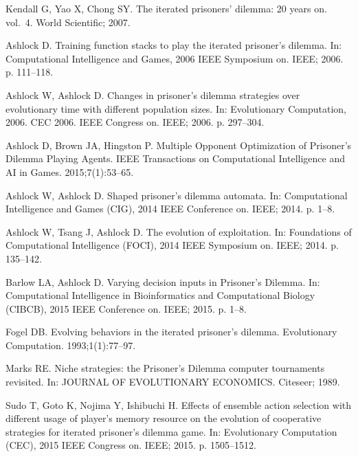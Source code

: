 \documentclass[10pt,letterpaper]{article}
\begin{document}
\begin{thebibliography}{10}
Kendall G, Yao X, Chong SY.
\newblock The iterated prisoners' dilemma: 20 years on. vol.~4.
\newblock World Scientific; 2007.

Ashlock D.
\newblock Training function stacks to play the iterated prisoner's dilemma.
\newblock In: Computational Intelligence and Games, 2006 IEEE Symposium on.
  IEEE; 2006. p. 111--118.

Ashlock W, Ashlock D.
\newblock Changes in prisoner’s dilemma strategies over evolutionary time
  with different population sizes.
\newblock In: Evolutionary Computation, 2006. CEC 2006. IEEE Congress on. IEEE;
  2006. p. 297--304.

Ashlock D, Brown JA, Hingston P.
\newblock Multiple Opponent Optimization of Prisoner’s Dilemma Playing
  Agents.
\newblock IEEE Transactions on Computational Intelligence and AI in Games.
  2015;7(1):53--65.

Ashlock W, Ashlock D.
\newblock Shaped prisoner's dilemma automata.
\newblock In: Computational Intelligence and Games (CIG), 2014 IEEE Conference
  on. IEEE; 2014. p. 1--8.

Ashlock W, Tsang J, Ashlock D.
\newblock The evolution of exploitation.
\newblock In: Foundations of Computational Intelligence (FOCI), 2014 IEEE
  Symposium on. IEEE; 2014. p. 135--142.

Barlow LA, Ashlock D.
\newblock Varying decision inputs in Prisoner's Dilemma.
\newblock In: Computational Intelligence in Bioinformatics and Computational
  Biology (CIBCB), 2015 IEEE Conference on. IEEE; 2015. p. 1--8.

Fogel DB.
\newblock Evolving behaviors in the iterated prisoner's dilemma.
\newblock Evolutionary Computation. 1993;1(1):77--97.

Marks RE.
\newblock Niche strategies: the Prisoner’s Dilemma computer tournaments
  revisited.
\newblock In: JOURNAL OF EVOLUTIONARY ECONOMICS. Citeseer; 1989.

Sudo T, Goto K, Nojima Y, Ishibuchi H.
\newblock Effects of ensemble action selection with different usage of player's
  memory resource on the evolution of cooperative strategies for iterated
  prisoner's dilemma game.
\newblock In: Evolutionary Computation (CEC), 2015 IEEE Congress on. IEEE;
  2015. p. 1505--1512.


\end{thebibliography}
\end{document}
